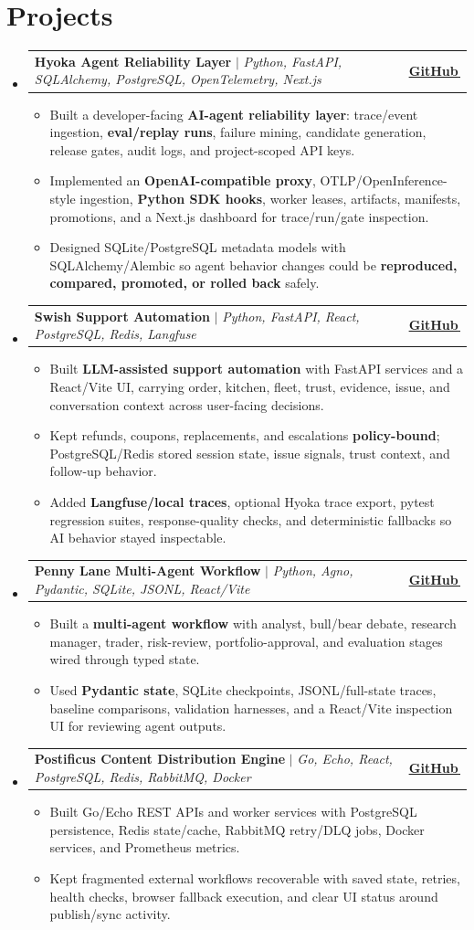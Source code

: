 \documentclass[letterpaper,11pt]{article}
\makeatletter
\newcommand{\bodyhref}[2]{\href{#1}{\underline{#2}\,\faExternalLink*}}
\newcommand{\resumeItem}[1]{\item{\fontsize{8.85pt}{9.25pt}\selectfont #1\vspace{-0.5pt}}}
\newcommand{\resumeProjectHeading}[2]{
    \item
    \begin{tabular*}{1.0\textwidth}{l@{\extracolsep{\fill}}r}
      \small#1 & \textbf{\small #2}\\
    \end{tabular*}\vspace{-4pt}
}
\newcommand{\resumeSubHeadingListStart}{\begin{itemize}[leftmargin=0.0in, label={}, itemsep=0.6pt, topsep=0pt, parsep=0pt, partopsep=0pt]}
\newcommand{\resumeSubHeadingListEnd}{\end{itemize}}
\newcommand{\resumeItemListStart}{\begin{itemize}[leftmargin=0.16in,itemsep=0.35pt,topsep=0.55pt,parsep=0pt,partopsep=0pt]}
\newcommand{\resumeItemListEnd}{\end{itemize}\vspace{-3pt}}
\makeatother
\begin{document}
\section{Projects}
\resumeSubHeadingListStart
\resumeProjectHeading
{\textbf{Hyoka Agent Reliability Layer} $|$ \emph{Python, FastAPI, SQLAlchemy, PostgreSQL, OpenTelemetry, Next.js}}{\bodyhref{https://github.com/unichronic/hyoka}{GitHub}}
\resumeItemListStart
\resumeItem{Built a developer-facing \textbf{AI-agent reliability layer}: trace/event ingestion, \textbf{eval/replay runs}, failure mining, candidate generation, release gates, audit logs, and project-scoped API keys.}
\resumeItem{Implemented an \textbf{OpenAI-compatible proxy}, OTLP/OpenInference-style ingestion, \textbf{Python SDK hooks}, worker leases, artifacts, manifests, promotions, and a Next.js dashboard for trace/run/gate inspection.}
\resumeItem{Designed SQLite/PostgreSQL metadata models with SQLAlchemy/Alembic so agent behavior changes could be \textbf{reproduced, compared, promoted, or rolled back} safely.}
\resumeItemListEnd
\resumeProjectHeading
{\textbf{Swish Support Automation} $|$ \emph{Python, FastAPI, React, PostgreSQL, Redis, Langfuse}}{\bodyhref{https://github.com/unichronic/swishagent}{GitHub}}
\resumeItemListStart
\resumeItem{Built \textbf{LLM-assisted support automation} with FastAPI services and a React/Vite UI, carrying order, kitchen, fleet, trust, evidence, issue, and conversation context across user-facing decisions.}
\resumeItem{Kept refunds, coupons, replacements, and escalations \textbf{policy-bound}; PostgreSQL/Redis stored session state, issue signals, trust context, and follow-up behavior.}
\resumeItem{Added \textbf{Langfuse/local traces}, optional Hyoka trace export, pytest regression suites, response-quality checks, and deterministic fallbacks so AI behavior stayed inspectable.}
\resumeItemListEnd
\resumeProjectHeading
{\textbf{Penny Lane Multi-Agent Workflow} $|$ \emph{Python, Agno, Pydantic, SQLite, JSONL, React/Vite}}{\bodyhref{https://github.com/unichronic/pennylane}{GitHub}}
\resumeItemListStart
\resumeItem{Built a \textbf{multi-agent workflow} with analyst, bull/bear debate, research manager, trader, risk-review, portfolio-approval, and evaluation stages wired through typed state.}
\resumeItem{Used \textbf{Pydantic state}, SQLite checkpoints, JSONL/full-state traces, baseline comparisons, validation harnesses, and a React/Vite inspection UI for reviewing agent outputs.}
\resumeItemListEnd
\resumeProjectHeading
{\textbf{Postificus Content Distribution Engine} $|$ \emph{Go, Echo, React, PostgreSQL, Redis, RabbitMQ, Docker}}{\bodyhref{https://github.com/unichronic/postificus}{GitHub}}
\resumeItemListStart
\resumeItem{Built Go/Echo REST APIs and worker services with PostgreSQL persistence, Redis state/cache, RabbitMQ retry/DLQ jobs, Docker services, and Prometheus metrics.}
\resumeItem{Kept fragmented external workflows recoverable with saved state, retries, health checks, browser fallback execution, and clear UI status around publish/sync activity.}
\resumeItemListEnd
\resumeSubHeadingListEnd
\end{document}

